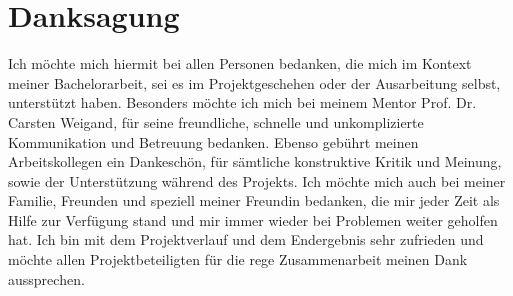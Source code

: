 \section*{Danksagung}
Ich möchte mich hiermit bei allen Personen bedanken, die mich im Kontext meiner Bachelorarbeit, sei es im Projektgeschehen oder der Ausarbeitung selbst, unterstützt haben. Besonders möchte ich mich bei meinem Mentor Prof. Dr. Carsten Weigand, für seine freundliche, schnelle und unkomplizierte Kommunikation und Betreuung bedanken. Ebenso gebührt meinen Arbeitskollegen ein Dankeschön, für sämtliche konstruktive Kritik und Meinung, sowie der Unterstützung während des Projekts. Ich möchte mich auch bei meiner Familie, Freunden und speziell meiner Freundin bedanken, die mir jeder Zeit als Hilfe zur Verfügung stand und mir immer wieder bei Problemen weiter geholfen hat. Ich bin mit dem Projektverlauf und dem Endergebnis sehr zufrieden und möchte allen Projektbeteiligten für die rege Zusammenarbeit meinen Dank aussprechen.